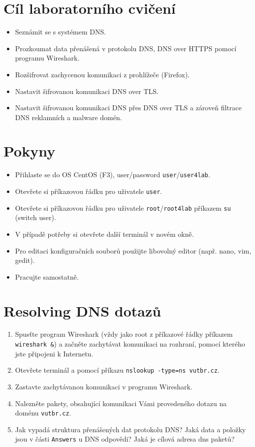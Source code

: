 \section*{Cíl laboratorního cvičení}
\begin{itemize}
  \item Seznámit se s systémem DNS.
  \item Prozkoumat data přenášená v protokolu DNS, DNS over HTTPS pomocí programu Wireshark.
  \item Rozšifrovat zachycenou komunikaci z prohlížeče (Firefox).
  \item Nastavit šifrovanou komunikaci DNS over TLS.
  \item Nastavit šifrovanou komunikaci DNS přes DNS over TLS a zároveň filtrace DNS reklamních a malware domén.
\end{itemize}

\section*{Pokyny}
\begin{itemize}
  \item Přihlaste se do OS CentOS (F3), user/password \texttt{user}/\texttt{user4lab}.
  \item Otevřete si příkazovou řádku pro uživatele \texttt{user}.
  \item Otevřete si příkazovou řádku pro uživatele \texttt{root}/\texttt{root4lab} příkazem \texttt{su}
    (switch user).
  \item V případě potřeby si otevřete další terminál v novém okně.
  \item Pro editaci konfiguračních souborů použijte libovolný editor (např.
    nano, vim, gedit).
  \item Pracujte samostatně.
\end{itemize}


\section{Resolving DNS dotazů}
\begin{enumerate}
    \item Spusťte program Wireshark (vždy jako root z příkazové řádky příkazem \texttt{wireshark \&}) a začněte zachytávat komunikaci na rozhraní, pomocí kterého jste připojeni k Internetu.
    \item Otevřete terminál a pomocí příkazu \texttt{nslookup -type=ns vutbr.cz}.
    \item Zastavte zachytávanou komunikaci v programu Wireshark.
    \item Nalezněte pakety, obsahující komunikaci Vámi provedeného dotazu na doménu \texttt{vutbr.cz}.
    \item Jak vypadá struktura přenášených dat protokolu DNS? Jaká data a položky jsou v části \texttt{Answers} u DNS odpovědi? Jaká je cílová adresa dns paketů?
\end{enumerate}

